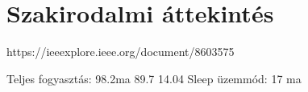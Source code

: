 
\chapter{Szakirodalmi áttekintés}

https://ieeexplore.ieee.org/document/8603575


Teljes fogyasztás: 98.2ma
89.7
14.04
Sleep üzemmód: 17 ma